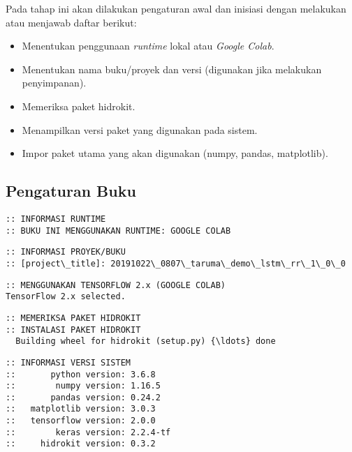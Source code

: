 \documentclass[11pt]{article}
\providecommand{\tightlist}{%
      \setlength{\itemsep}{0pt}\setlength{\parskip}{0pt}}
\begin{document}
Pada tahap ini akan dilakukan pengaturan awal dan inisiasi dengan
melakukan atau menjawab daftar berikut:

\begin{itemize}
\tightlist
\item
  Menentukan penggunaan \emph{runtime} lokal atau \emph{Google Colab}.
\item
  Menentukan nama buku/proyek dan versi (digunakan jika melakukan
  penyimpanan).
\item
  Memeriksa paket hidrokit.
\item
  Menampilkan versi paket yang digunakan pada sistem.
\item
  Impor paket utama yang akan digunakan (numpy, pandas, matplotlib).
\end{itemize}

    \hypertarget{pengaturan-buku}{%
\subsection{Pengaturan Buku}\label{pengaturan-buku}}

    \begin{Verbatim}[commandchars=\\\{\}]
:: INFORMASI RUNTIME
:: BUKU INI MENGGUNAKAN RUNTIME: GOOGLE COLAB
    \end{Verbatim}

    \begin{Verbatim}[commandchars=\\\{\}]
:: INFORMASI PROYEK/BUKU
:: [project\_title]: 20191022\_0807\_taruma\_demo\_lstm\_rr\_1\_0\_0
    \end{Verbatim}

    \begin{Verbatim}[commandchars=\\\{\}]
:: MENGGUNAKAN TENSORFLOW 2.x (GOOGLE COLAB)
TensorFlow 2.x selected.
    \end{Verbatim}

    \begin{Verbatim}[commandchars=\\\{\}]
:: MEMERIKSA PAKET HIDROKIT
:: INSTALASI PAKET HIDROKIT
  Building wheel for hidrokit (setup.py) {\ldots} done
    \end{Verbatim}

    \begin{Verbatim}[commandchars=\\\{\}]
:: INFORMASI VERSI SISTEM
::       python version: 3.6.8
::        numpy version: 1.16.5
::       pandas version: 0.24.2
::   matplotlib version: 3.0.3
::   tensorflow version: 2.0.0
::        keras version: 2.2.4-tf
::     hidrokit version: 0.3.2
    \end{Verbatim}
\end{document}
